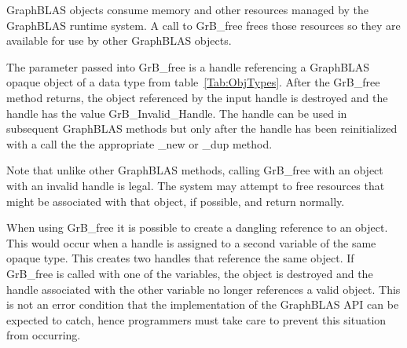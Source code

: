 GraphBLAS objects consume memory and other resources
managed by the GraphBLAS runtime system. A call to {\sf GrB\_free}
frees those resources so they are available for use by other GraphBLAS objects.

The parameter passed into {\sf GrB\_free} is a handle referencing a GraphBLAS 
opaque object of a data type from table~\ref{Tab:ObjTypes}.    After the {\sf GrB\_free} 
method returns, the object referenced by the input handle is destroyed 
and the handle has the value {\sf GrB\_Invalid\_Handle}.
The handle can be used in subsequent GraphBLAS methods but only after the handle
has been reinitialized with a call the the appropriate {\sf \_new} or {\sf \_dup} method.

Note that unlike other GraphBLAS methods, calling {\sf GrB\_free} with an object with 
an invalid handle is legal.  The system may attempt to free resources that might be associated
with that object, if possible, and return normally.

When using {\sf GrB\_free} it is possible to create a dangling reference to an object.  This would occur
when a handle is assigned to a second variable of the same opaque type.  This creates two handles that reference
the same object. If {\sf GrB\_free} is called with one of the variables, the object is destroyed
and the handle associated with the other variable no longer references a valid object.  This is not
an error condition that the implementation of the GraphBLAS API can be expected to catch, hence
programmers must take care to prevent this situation from occurring.  


